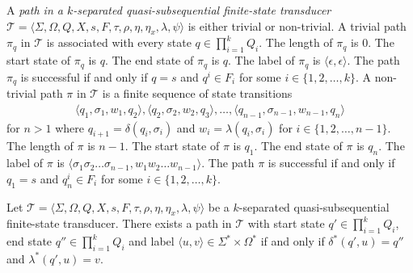 \begin{definition}
  A \emph{path in a $k$-separated quasi-subsequential finite-state transducer}
  $\mathcal{T} = \langle \Sigma, \Omega, Q, X, s, F, \tau, \rho, \eta, \eta_x,
  \lambda, \psi \rangle$ is either trivial or non-trivial. A trivial path $\pi_q$ in
  $\mathcal{T}$ is associated with every state $q \in \prod_{i=1}^k Q_i$. The length of
  $\pi_q$ is $0$. The start state of $\pi_q$ is $q$. The end state of $\pi_q$ is $q$.
  The label of $\pi_q$ is $\langle \epsilon, \epsilon \rangle$. The path $\pi_q$ is
  successful if and only if $q = s$ and $q^i \in F_i$ for some $i \in \{ 1, 2,
  \ldots, k \}$. A non-trivial path $\pi$ in $\mathcal{T}$ is a finite sequence of
  state transitions
  \begin{align*}
    \langle q_1, \sigma_1, w_1, q_2 \rangle, \langle q_2, \sigma_2, w_2, q_3 \rangle,
    \dots, \langle q_{n-1}, \sigma_{n-1}, w_{n-1}, q_n \rangle
  \end{align*}
  for $n > 1$ where $q_{i+1} = \delta(q_i, \sigma_i)$ and $w_i = \lambda(q_i,
  \sigma_i)$ for $i \in \{ 1, 2, \ldots, n-1 \}$. The length of $\pi$ is $n-1$. The
  start state of $\pi$ is $q_1$. The end state of $\pi$ is $q_n$. The label of $\pi$
  is $\langle \sigma_1 \sigma_2 \ldots \sigma_{n-1}, w_1 w_2 \ldots w_{n-1} \rangle$.
  The path $\pi$ is successful if and only if $q_1 = s$ and $q_n^i \in F_i$ for some
  $i \in \{ 1, 2, \ldots, k \}$.
\end{definition}

\begin{proposition}
  Let $\mathcal{T} = \langle \Sigma, \Omega, Q, X, s, F, \tau, \rho, \eta, \eta_x,
  \lambda, \psi \rangle$ be a $k$-separa\-ted quasi-subsequential finite-state
  transducer. There exists a path in $\mathcal{T}$ with start state $q' \in
  \prod_{i=1}^k Q_i$, end state $q'' \in \prod_{i=1}^k Q_i$ and label $\langle u, v \rangle
  \in \Sigma^* \times \Omega^*$ if and only if $\delta^*(q', u) = q''$ and
  $\lambda^*(q', u) = v$.
\end{proposition}

